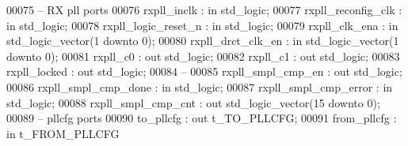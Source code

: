 \begin{DoxyCode}
00075 \textcolor{keyword}{      -- RX pll ports}
00076       \textcolor{vhdlchar}{rxpll_inclk}          \textcolor{vhdlchar}{:} \textcolor{keywordflow}{in}  \textcolor{comment}{std\_logic};
00077       \textcolor{vhdlchar}{rxpll_reconfig_clk}   \textcolor{vhdlchar}{:} \textcolor{keywordflow}{in}  \textcolor{comment}{std\_logic};
00078       \textcolor{vhdlchar}{rxpll_logic_reset_n}  \textcolor{vhdlchar}{:} \textcolor{keywordflow}{in}  \textcolor{comment}{std\_logic};
00079       \textcolor{vhdlchar}{rxpll_clk_ena}        \textcolor{vhdlchar}{:} \textcolor{keywordflow}{in}  \textcolor{comment}{std\_logic\_vector}\textcolor{vhdlchar}{(}\textcolor{vhdllogic}{}\textcolor{vhdllogic}{1} \textcolor{keywordflow}{downto} \textcolor{vhdllogic}{}\textcolor{vhdllogic}{0}\textcolor{vhdlchar}{)};
00080       \textcolor{vhdlchar}{rxpll_drct_clk_en}    \textcolor{vhdlchar}{:} \textcolor{keywordflow}{in}  \textcolor{comment}{std\_logic\_vector}\textcolor{vhdlchar}{(}\textcolor{vhdllogic}{}\textcolor{vhdllogic}{1} \textcolor{keywordflow}{downto} \textcolor{vhdllogic}{}\textcolor{vhdllogic}{0}\textcolor{vhdlchar}{)}; 
00081       \textcolor{vhdlchar}{rxpll_c0}             \textcolor{vhdlchar}{:} \textcolor{keywordflow}{out} \textcolor{comment}{std\_logic};
00082       \textcolor{vhdlchar}{rxpll_c1}             \textcolor{vhdlchar}{:} \textcolor{keywordflow}{out} \textcolor{comment}{std\_logic};
00083       \textcolor{vhdlchar}{rxpll_locked}         \textcolor{vhdlchar}{:} \textcolor{keywordflow}{out} \textcolor{comment}{std\_logic};
00084 \textcolor{keyword}{      --}
00085       \textcolor{vhdlchar}{rxpll_smpl_cmp_en}    \textcolor{vhdlchar}{:} \textcolor{keywordflow}{out} \textcolor{comment}{std\_logic};      
00086       \textcolor{vhdlchar}{rxpll_smpl_cmp_done}  \textcolor{vhdlchar}{:} \textcolor{keywordflow}{in}  \textcolor{comment}{std\_logic};
00087       \textcolor{vhdlchar}{rxpll_smpl_cmp_error} \textcolor{vhdlchar}{:} \textcolor{keywordflow}{in}  \textcolor{comment}{std\_logic};
00088       \textcolor{vhdlchar}{rxpll_smpl_cmp_cnt}   \textcolor{vhdlchar}{:} \textcolor{keywordflow}{out} \textcolor{comment}{std\_logic\_vector}\textcolor{vhdlchar}{(}\textcolor{vhdllogic}{}\textcolor{vhdllogic}{15} \textcolor{keywordflow}{downto} \textcolor{vhdllogic}{}\textcolor{vhdllogic}{0}\textcolor{vhdlchar}{)};
00089 \textcolor{keyword}{      -- pllcfg ports}
00090       \textcolor{vhdlchar}{to_pllcfg}            \textcolor{vhdlchar}{:} \textcolor{keywordflow}{out} \textcolor{vhdlchar}{t_TO_PLLCFG};
00091       \textcolor{vhdlchar}{from_pllcfg}          \textcolor{vhdlchar}{:} \textcolor{keywordflow}{in} \textcolor{vhdlchar}{t_FROM_PLLCFG}

\end{DoxyCode}
